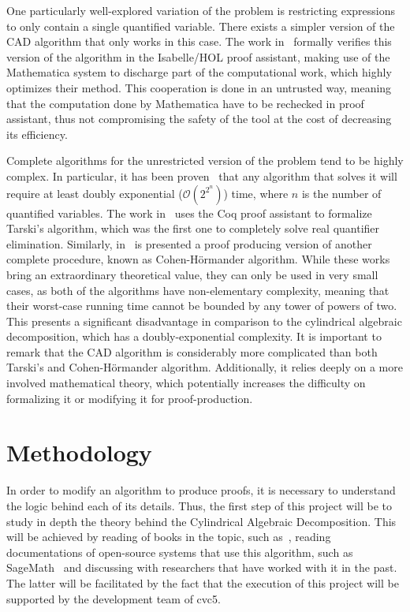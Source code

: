 \documentclass[a4paper, 12pt]{article}
\begin{document}
One particularly well-explored variation of the problem is restricting expressions to only contain a single quantified variable.
There exists a simpler version of the CAD algorithm that only works in this case. The work in~\cite{univCad} formally verifies
this version of the algorithm in the Isabelle/HOL proof assistant, making use of the Mathematica system to discharge
part of the computational work, which highly optimizes their method. This cooperation is done in an untrusted way, meaning
that the computation done by Mathematica have to be rechecked in proof assistant, thus not compromising the safety of the tool at
the cost of decreasing its efficiency.

Complete algorithms for the unrestricted version of the problem tend to be highly complex. In particular, it has been
proven~\cite{doublyExponential} that any algorithm that solves it will require at least doubly exponential
($\mathcal{O}(2^{2^{n}})$) time, where $n$ is the number of quantified variables. The work
in~\cite{coqTarski} uses the Coq proof assistant to formalize Tarski's algorithm, which was the first one to completely
solve real quantifier elimination. Similarly, in~\cite{mcLaughlin} is presented a proof producing version of another
complete procedure, known as Cohen-H{\"o}rmander algorithm. While these works bring an extraordinary theoretical
value, they can only be used in very small cases, as both of the algorithms have non-elementary complexity, meaning that
their worst-case running time cannot be bounded by any tower of powers of two. This presents a significant disadvantage
in comparison to the cylindrical algebraic decomposition, which has a doubly-exponential complexity. It is important to
remark that the CAD algorithm is considerably more complicated than both Tarski's and Cohen-H{\"o}rmander algorithm.
Additionally, it relies deeply on a more involved mathematical theory, which potentially increases the difficulty
on formalizing it or modifying it for proof-production.

\section{Methodology}
\label{sec:methodology}

In order to modify an algorithm to produce proofs, it is necessary to understand the logic behind
each of its details. Thus, the first step of this project will be to study in depth the
theory behind the Cylindrical Algebraic Decomposition. This will be achieved by reading of books in the topic,
such as~\cite{computerAlgebraBook}, reading documentations of open-source systems that use this
algorithm, such as SageMath~\cite{sage} and discussing with researchers that have worked with it in the past.
The latter will be facilitated by the fact that the execution of this project will be supported by the
development team of cvc5.
\end{document}
